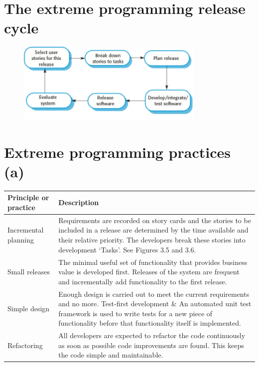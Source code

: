 \section{ The extreme programming release cycle}
\begin{figure}[h!]
    \centering
    \includegraphics[width = 0.8\textwidth]{./figures/L2_2.png}
    \caption{}
    \label{fig:L2_2}
\end{figure}
\newpage
\section{ Extreme programming practices (a)}

\begin{table}[h!]
\centering
\begin{tabular}{ |p{3cm}|p{8cm}|  }
\hline
Principle or practice & Description  \\
\hline
\hline
Incremental planning & Requirements are recorded on story cards and the stories to be included in a release are determined by the time available and their relative priority. The developers break these stories into development ‘Tasks’. See Figures 3.5 and 3.6.\\
\hline
Small releases & The minimal useful set of functionality that provides business value is developed first. Releases of the system are frequent and incrementally add functionality to the first release.\\
\hline
Simple design & Enough design is carried out to meet the current requirements and no more. Test-first development \& An automated unit test framework is used to write tests for a new piece of functionality before that functionality itself is implemented.\\
\hline
Refactoring & All developers are expected to refactor the code continuously as soon as possible code improvements are found. This keeps the code simple and maintainable.\\
\hline
\end{tabular}

\label{table:T2_2}
\end{table}
\newpage
